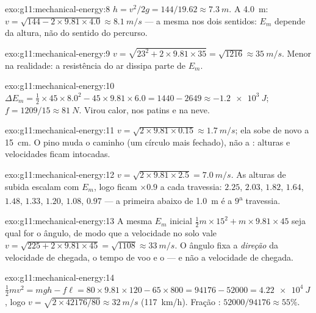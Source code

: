\begin{solution}{exo:g11:mechanical-energy:8}
$h = v^2/2g = 144/19.62 \approx \qty{7.3}{m}$. A \qty{4.0}{m}:
$v = \sqrt{144 - 2 \times 9.81 \times 4.0} \approx \qty{8.1}{m/s}$ --- a
mesma nos dois sentidos: $E_m$ depende da altura, não do sentido do
percurso.
\end{solution}

\begin{solution}{exo:g11:mechanical-energy:9}
$v = \sqrt{23^2 + 2 \times 9.81 \times 35} = \sqrt{1216} \approx
\qty{35}{m/s}$. Menor na realidade: a resistência do ar dissipa parte de
$E_m$.
\end{solution}

\begin{solution}{exo:g11:mechanical-energy:10}
$\Delta E_m = \tfrac12 \times 45 \times 8.0^2 - 45 \times 9.81 \times
6.0 = 1440 - 2649 \approx \qty{-1.2e3}{J}$;
$f = 1209/15 \approx \qty{81}{N}$. Virou calor, nos patins e na neve.
\end{solution}

\begin{solution}{exo:g11:mechanical-energy:11}
$v = \sqrt{2 \times 9.81 \times 0.15} \approx \qty{1.7}{m/s}$; ela sobe
de novo a \qty{15}{cm}. O pino muda o caminho (um círculo mais fechado),
não a : alturas e velocidades ficam intocadas.
\end{solution}

\begin{solution}{exo:g11:mechanical-energy:12}
$v = \sqrt{2 \times 9.81 \times 2.5} = \qty{7.0}{m/s}$. As alturas de
subida escalam com $E_m$, logo ficam $\times 0.9$ a cada travessia:
$2.25$, $2.03$, $1.82$, $1.64$, $1.48$, $1.33$, $1.20$, $1.08$, $0.97$
--- a primeira abaixo de \qty{1.0}{m} é a $9$\textsuperscript{a}
travessia.
\end{solution}

\begin{solution}{exo:g11:mechanical-energy:13}
A mesma $E_m$ inicial
$\tfrac12 m \times 15^2 + m \times 9.81 \times 45$ seja qual for o
ângulo, de modo que a velocidade no solo vale
$v = \sqrt{225 + 2 \times 9.81 \times 45} = \sqrt{1108} \approx
\qty{33}{m/s}$. O ângulo fixa a \emph{direção} da velocidade de chegada,
o tempo de voo e o  --- e não a velocidade de chegada.
\end{solution}

\begin{solution}{exo:g11:mechanical-energy:14}
$\tfrac12 mv^2 = mgh - f\ell = 80 \times 9.81 \times 120 - 65 \times
800 = \num{94176} - \num{52000} = \qty{4.22e4}{J}$, logo
$v = \sqrt{2 \times \num{42176}/80} \approx \qty{32}{m/s}$
(\qty{117}{km/h}). Fração :
$52000/94176 \approx 55\%$.
\end{solution}

